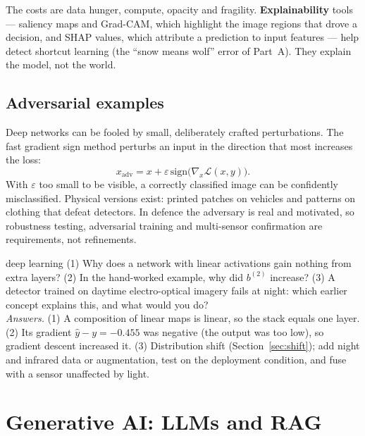 \documentclass[11pt]{article}
\begin{document}
The costs are data hunger, compute, opacity and fragility. \textbf{Explainability} tools --- saliency maps and Grad-CAM, which highlight the image regions that drove a decision, and SHAP values, which attribute a prediction to input features --- help detect shortcut learning (the ``snow means wolf'' error of Part~A). They explain the model, not the world.

\subsection{Adversarial examples}
Deep networks can be fooled by small, deliberately crafted perturbations. The fast gradient sign method perturbs an input in the direction that most increases the loss:
\[x_{\text{adv}}=x+\varepsilon\,\text{sign}\big(\nabla_x\mathcal L(x,y)\big).\]
With $\varepsilon$ too small to be visible, a correctly classified image can be confidently misclassified. Physical versions exist: printed patches on vehicles and patterns on clothing that defeat detectors. In defence the adversary is real and motivated, so robustness testing, adversarial training and multi-sensor confirmation are requirements, not refinements.
\begin{question}{deep learning}
(1) Why does a network with linear activations gain nothing from extra layers? (2) In the hand-worked example, why did $b^{(2)}$ increase? (3) A detector trained on daytime electro-optical imagery fails at night: which earlier concept explains this, and what would you do?\\
\textit{Answers.} (1) A composition of linear maps is linear, so the stack equals one layer. (2) Its gradient $\hat y-y=-0.455$ was negative (the output was too low), so gradient descent increased it. (3) Distribution shift (Section~\ref{sec:shift}); add night and infrared data or augmentation, test on the deployment condition, and fuse with a sensor unaffected by light.
\end{question}

\section{Generative AI: LLMs and RAG}
\end{document}
